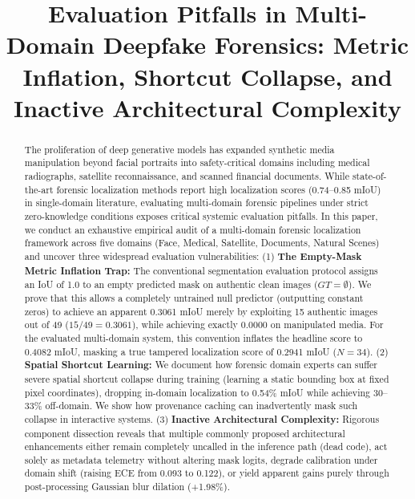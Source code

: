 \documentclass[conference]{IEEEtran}
\begin{document}
\title{Evaluation Pitfalls in Multi-Domain Deepfake Forensics: Metric Inflation, Shortcut Collapse, and Inactive Architectural Complexity}

\author{
}

\maketitle

\begin{abstract}
The proliferation of deep generative models has expanded synthetic media manipulation beyond facial portraits into safety-critical domains including medical radiographs, satellite reconnaissance, and scanned financial documents. While state-of-the-art forensic localization methods report high localization scores (0.74--0.85 mIoU) in single-domain literature, evaluating multi-domain forensic pipelines under strict zero-knowledge conditions exposes critical systemic evaluation pitfalls. In this paper, we conduct an exhaustive empirical audit of a multi-domain forensic localization framework across five domains (Face, Medical, Satellite, Documents, Natural Scenes) and uncover three widespread evaluation vulnerabilities:
(1) \textbf{The Empty-Mask Metric Inflation Trap:} The conventional segmentation evaluation protocol assigns an IoU of 1.0 to an empty predicted mask on authentic clean images ($GT = \emptyset$). We prove that this allows a completely untrained null predictor (outputting constant zeros) to achieve an apparent 0.3061 mIoU merely by exploiting 15 authentic images out of 49 ($15/49 = 0.3061$), while achieving exactly 0.0000 on manipulated media. For the evaluated multi-domain system, this convention inflates the headline score to 0.4082 mIoU, masking a true tampered localization score of 0.2941 mIoU ($N=34$).
(2) \textbf{Spatial Shortcut Learning:} We document how forensic domain experts can suffer severe spatial shortcut collapse during training (learning a static bounding box at fixed pixel coordinates), dropping in-domain localization to 0.54\% mIoU while achieving 30--33\% off-domain. We show how provenance caching can inadvertently mask such collapse in interactive systems.
(3) \textbf{Inactive Architectural Complexity:} Rigorous component dissection reveals that multiple commonly proposed architectural enhancements either remain completely uncalled in the inference path (dead code), act solely as metadata telemetry without altering mask logits, degrade calibration under domain shift (raising ECE from 0.093 to 0.122), or yield apparent gains purely through post-processing Gaussian blur dilation (+1.98\%).

\end{abstract}
\end{document}
